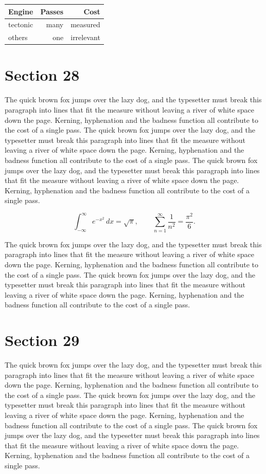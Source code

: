 \documentclass{article}
\begin{document}
\begin{center}
\begin{tabular}{lrr}
\toprule
Engine & Passes & Cost \\
\midrule
tectonic & many & measured \\
others & one & irrelevant \\
\bottomrule
\end{tabular}
\end{center}

\section{Section 28}
The quick brown fox jumps over the lazy dog, and the typesetter must break this paragraph into lines that fit the measure without leaving a river of white space down the page. Kerning, hyphenation and the badness function all contribute to the cost of a single pass. The quick brown fox jumps over the lazy dog, and the typesetter must break this paragraph into lines that fit the measure without leaving a river of white space down the page. Kerning, hyphenation and the badness function all contribute to the cost of a single pass. The quick brown fox jumps over the lazy dog, and the typesetter must break this paragraph into lines that fit the measure without leaving a river of white space down the page. Kerning, hyphenation and the badness function all contribute to the cost of a single pass. 

\begin{equation}
\int_{-\infty}^{\infty} e^{-x^{2}}\,dx = \sqrt{\pi}, \qquad
\sum_{n=1}^{\infty} \frac{1}{n^{2}} = \frac{\pi^{2}}{6}.
\end{equation}

The quick brown fox jumps over the lazy dog, and the typesetter must break this paragraph into lines that fit the measure without leaving a river of white space down the page. Kerning, hyphenation and the badness function all contribute to the cost of a single pass. The quick brown fox jumps over the lazy dog, and the typesetter must break this paragraph into lines that fit the measure without leaving a river of white space down the page. Kerning, hyphenation and the badness function all contribute to the cost of a single pass. 
\section{Section 29}
The quick brown fox jumps over the lazy dog, and the typesetter must break this paragraph into lines that fit the measure without leaving a river of white space down the page. Kerning, hyphenation and the badness function all contribute to the cost of a single pass. The quick brown fox jumps over the lazy dog, and the typesetter must break this paragraph into lines that fit the measure without leaving a river of white space down the page. Kerning, hyphenation and the badness function all contribute to the cost of a single pass. The quick brown fox jumps over the lazy dog, and the typesetter must break this paragraph into lines that fit the measure without leaving a river of white space down the page. Kerning, hyphenation and the badness function all contribute to the cost of a single pass. 
\end{document}
